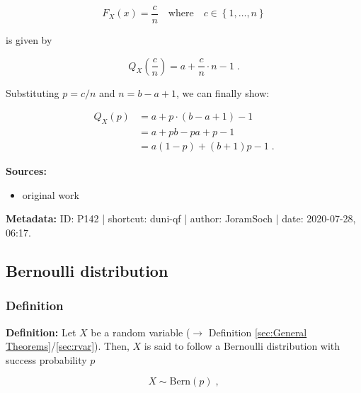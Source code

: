 \documentclass[a4paper,12pt,twoside]{book}
\begin{document}
\begin{equation} \label{eq:duni-qf-duni-cdf-p}
F_X(x) = \frac{c}{n} \quad \text{where} \quad c \in \left\lbrace 1, \ldots, n \right\rbrace
\end{equation}

is given by

\begin{equation} \label{eq:duni-qf-duni-qf-p}
Q_X\left( \frac{c}{n} \right) = a + \frac{c}{n} \cdot n - 1 \; .
\end{equation}

Substituting $p = c/n$ and $n = b - a + 1$, we can finally show:

\begin{equation} \label{eq:duni-qf-duni-qf-qed}
\begin{split}
Q_X(p) &= a + p \cdot (b-a+1) - 1 \\
&= a + pb - pa + p - 1 \\
&= a (1-p) + (b+1) p - 1 \; .
\end{split}
\end{equation}


\vspace{1em}
\textbf{Sources:}
\begin{itemize}
\item original work\end{itemize}


\vspace{1em}
\textbf{Metadata:} ID: P142 | shortcut: duni-qf | author: JoramSoch | date: 2020-07-28, 06:17.
\vspace{1em}



\subsection{Bernoulli distribution}

\subsubsection[\textit{Definition}]{Definition} \label{sec:bern}
\setcounter{equation}{0}

\textbf{Definition:} Let $X$ be a random variable ($\rightarrow$ Definition \ref{sec:General Theorems}/\ref{sec:rvar}). Then, $X$ is said to follow a Bernoulli distribution with success probability $p$

\begin{equation} \label{eq:bern-bern}
X \sim \mathrm{Bern}(p) \; ,
\end{equation}
\end{document}
